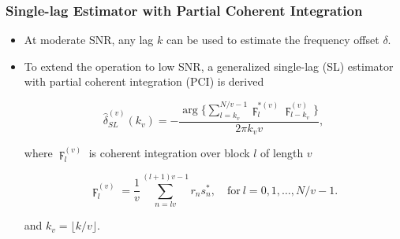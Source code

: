 \begin{frame}
  \frametitle{Single-lag Estimator with Partial Coherent Integration}

    \begin{itemize}
    
      \item At moderate SNR, any lag $k$ can be used to estimate the frequency offset $\delta$. 
      
      
      \item To extend the operation to low SNR, a generalized single-lag (SL) estimator with partial coherent integration (PCI) is derived
      
      \begin{equation}
        \label{eq:single_lag_estimator_w_partial_corr}
        \hat{\delta}_{SL}^{(v)}(k_v)=-\frac{\arg\big\{\sum_{l=k_v}^{N/v-1}\digamma_l^{*(v)}\digamma_{l-k_v}^{(v)}\big\}}{2\pi k_vv},
      \end{equation}

      where $\digamma_{l}^{(v)}$ is coherent integration over block $l$
      of length $v$

      \begin{equation}
        \label{eq:coherent_integrator}
        \digamma_l^{(v)}=\frac{1}{v}\sum_{n=lv}^{(l+1)v-1}r_ns_n^*, \quad \text{for}~l=0,1,\ldots,N/v{-}1.
      \end{equation}

      and 
      $k_v=\lfloor k/v \rfloor$.
     
    \end{itemize}



\end{frame}



